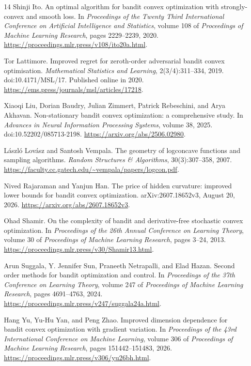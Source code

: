\documentclass[11pt]{article}
\numberwithin{equation}{section}
\newcounter{algorithm}
\theoremstyle{definition}
\theoremstyle{remark}
\begin{document}
\begin{thebibliography}{14}
Shinji Ito.
\newblock An optimal algorithm for bandit convex optimization with
strongly-convex and smooth loss.
\newblock In \emph{Proceedings of the Twenty Third International Conference on
Artificial Intelligence and Statistics}, volume 108 of \emph{Proceedings of
Machine Learning Research}, pages 2229--2239, 2020.
\newblock \url{https://proceedings.mlr.press/v108/ito20a.html}.

Tor Lattimore.
\newblock Improved regret for zeroth-order adversarial bandit convex optimisation.
\newblock \emph{Mathematical Statistics and Learning}, 2(3/4):311--334, 2019.
\newblock doi:10.4171/MSL/17. Published online in 2020.
\newblock \url{https://ems.press/journals/msl/articles/17218}.

Xiaoqi Liu, Dorian Baudry, Julian Zimmert, Patrick Rebeschini, and Arya Akhavan.
\newblock Non-stationary bandit convex optimization: a comprehensive study.
\newblock In \emph{Advances in Neural Information Processing Systems},
volume 38, 2025.
\newblock doi:10.52202/085713-2198.
\newblock \url{https://arxiv.org/abs/2506.02980}.

L\'aszl\'o Lov\'asz and Santosh Vempala.
\newblock The geometry of logconcave functions and sampling algorithms.
\newblock \emph{Random Structures \& Algorithms}, 30(3):307--358, 2007.
\newblock \url{https://faculty.cc.gatech.edu/~vempala/papers/logcon.pdf}.

Nived Rajaraman and Yanjun Han.
\newblock The price of hidden curvature: improved lower bounds for bandit convex
optimization.
\newblock arXiv:2607.18652v3, August 20, 2026.
\newblock \url{https://arxiv.org/abs/2607.18652v3}.

Ohad Shamir.
\newblock On the complexity of bandit and derivative-free stochastic convex
optimization.
\newblock In \emph{Proceedings of the 26th Annual Conference on Learning Theory},
volume 30 of \emph{Proceedings of Machine Learning Research}, pages 3--24, 2013.
\newblock \url{https://proceedings.mlr.press/v30/Shamir13.html}.

Arun Suggala, Y. Jennifer Sun, Praneeth Netrapalli, and Elad Hazan.
\newblock Second order methods for bandit optimization and control.
\newblock In \emph{Proceedings of the 37th Conference on Learning Theory},
volume 247 of \emph{Proceedings of Machine Learning Research}, pages 4691--4763,
2024.
\newblock \url{https://proceedings.mlr.press/v247/suggala24a.html}.

Hang Yu, Yu-Hu Yan, and Peng Zhao.
\newblock Improved dimension dependence for bandit convex optimization with
gradient variation.
\newblock In \emph{Proceedings of the 43rd International Conference on Machine
Learning}, volume 306 of \emph{Proceedings of Machine Learning Research},
pages 151442--151483, 2026.
\newblock \url{https://proceedings.mlr.press/v306/yu26bh.html}.
\end{thebibliography}
\end{document}
